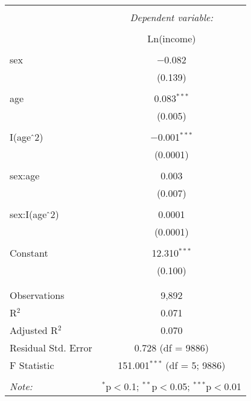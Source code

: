 
\begin{table}[!htbp] \centering 
  \caption{} 
  \label{} 
\begin{tabular}{@{\extracolsep{5pt}}lc} 
\\[-1.8ex]\hline 
\hline \\[-1.8ex] 
 & \multicolumn{1}{c}{\textit{Dependent variable:}} \\ 
\cline{2-2} 
\\[-1.8ex] & Ln(income) \\ 
\hline \\[-1.8ex] 
 sex & $-$0.082 \\ 
  & (0.139) \\ 
  & \\ 
 age & 0.083$^{***}$ \\ 
  & (0.005) \\ 
  & \\ 
 I(age$\hat{\mkern6mu}$2) & $-$0.001$^{***}$ \\ 
  & (0.0001) \\ 
  & \\ 
 sex:age & 0.003 \\ 
  & (0.007) \\ 
  & \\ 
 sex:I(age$\hat{\mkern6mu}$2) & 0.0001 \\ 
  & (0.0001) \\ 
  & \\ 
 Constant & 12.310$^{***}$ \\ 
  & (0.100) \\ 
  & \\ 
\hline \\[-1.8ex] 
Observations & 9,892 \\ 
R$^{2}$ & 0.071 \\ 
Adjusted R$^{2}$ & 0.070 \\ 
Residual Std. Error & 0.728 (df = 9886) \\ 
F Statistic & 151.001$^{***}$ (df = 5; 9886) \\ 
\hline 
\hline \\[-1.8ex] 
\textit{Note:}  & \multicolumn{1}{r}{$^{*}$p$<$0.1; $^{**}$p$<$0.05; $^{***}$p$<$0.01} \\ 
\end{tabular} 
\end{table} 
